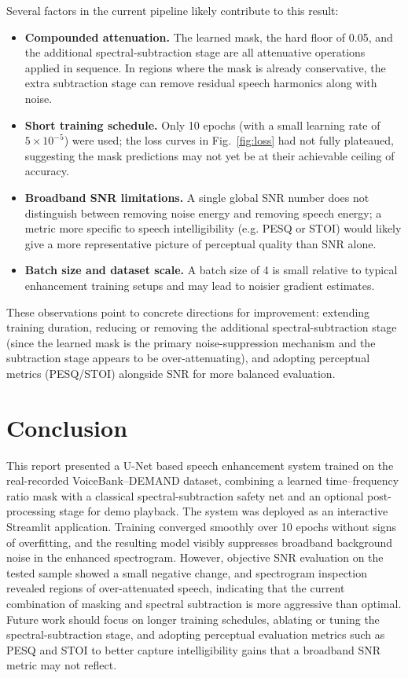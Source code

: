 \documentclass[conference]{IEEEtran}
\begin{document}
Several factors in the current pipeline likely contribute to this result:
\begin{itemize}
    \item \textbf{Compounded attenuation.} The learned mask, the hard floor of 0.05, and the additional spectral-subtraction stage are all attenuative operations applied in sequence. In regions where the mask is already conservative, the extra subtraction stage can remove residual speech harmonics along with noise.
    \item \textbf{Short training schedule.} Only 10 epochs (with a small learning rate of $5\times10^{-5}$) were used; the loss curves in Fig.~\ref{fig:loss} had not fully plateaued, suggesting the mask predictions may not yet be at their achievable ceiling of accuracy.
    \item \textbf{Broadband SNR limitations.} A single global SNR number does not distinguish between removing noise energy and removing speech energy; a metric more specific to speech intelligibility (e.g. PESQ or STOI) would likely give a more representative picture of perceptual quality than SNR alone.
    \item \textbf{Batch size and dataset scale.} A batch size of 4 is small relative to typical enhancement training setups and may lead to noisier gradient estimates.
\end{itemize}
These observations point to concrete directions for improvement: extending training duration, reducing or removing the additional spectral-subtraction stage (since the learned mask is the primary noise-suppression mechanism and the subtraction stage appears to be over-attenuating), and adopting perceptual metrics (PESQ/STOI) alongside SNR for more balanced evaluation.

\section{Conclusion}
This report presented a U-Net based speech enhancement system trained on the real-recorded VoiceBank--DEMAND dataset, combining a learned time--frequency ratio mask with a classical spectral-subtraction safety net and an optional post-processing stage for demo playback. The system was deployed as an interactive Streamlit application. Training converged smoothly over 10 epochs without signs of overfitting, and the resulting model visibly suppresses broadband background noise in the enhanced spectrogram. However, objective SNR evaluation on the tested sample showed a small negative change, and spectrogram inspection revealed regions of over-attenuated speech, indicating that the current combination of masking and spectral subtraction is more aggressive than optimal. Future work should focus on longer training schedules, ablating or tuning the spectral-subtraction stage, and adopting perceptual evaluation metrics such as PESQ and STOI to better capture intelligibility gains that a broadband SNR metric may not reflect.
\end{document}
